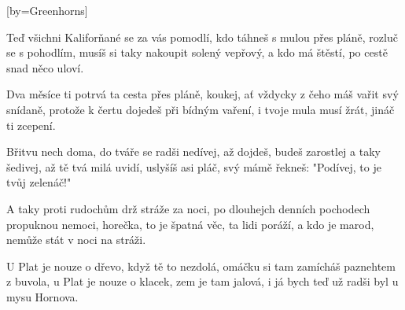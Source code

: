 [by={Greenhorns}]

\beginverse{}
Teď všichni Kaliforňané se za vás pomodlí,
kdo táhneš s mulou přes pláně, rozluč se s pohodlím,
musíš si taky nakoupit solený vepřový,
a kdo má štěstí, po cestě snad něco uloví.
\endverse{}

\beginverse{}
Dva měsíce ti potrvá ta cesta přes pláně,
koukej, ať vždycky z čeho máš vařit svý snídaně,
protože k čertu dojedeš při bídným vaření,
i tvoje mula musí žrát, jináč ti zcepení.
\endverse{}

\beginverse{}
Břitvu nech doma, do tváře se radši nedívej,
až dojdeš, budeš zarostlej a taky šedivej,
až tě tvá milá uvidí, uslyšíš asi pláč,
svý mámě řekneš: "Podívej, to je tvůj zelenáč!"
\endverse{}

\beginverse{}
A taky proti rudochům drž stráže za noci,
po dlouhejch denních pochodech propuknou nemoci,
horečka, to je špatná věc, ta lidi poráží,
a kdo je marod, nemůže stát v noci na stráži.
\endverse{}

\beginverse{}
U Plat je nouze o dřevo, když tě to nezdolá,
omáčku si tam zamícháš paznehtem z buvola,
u Plat je nouze o klacek, zem je tam jalová,
i já bych teď už radši byl u mysu Hornova.
\endverse{}

\endsong{}
